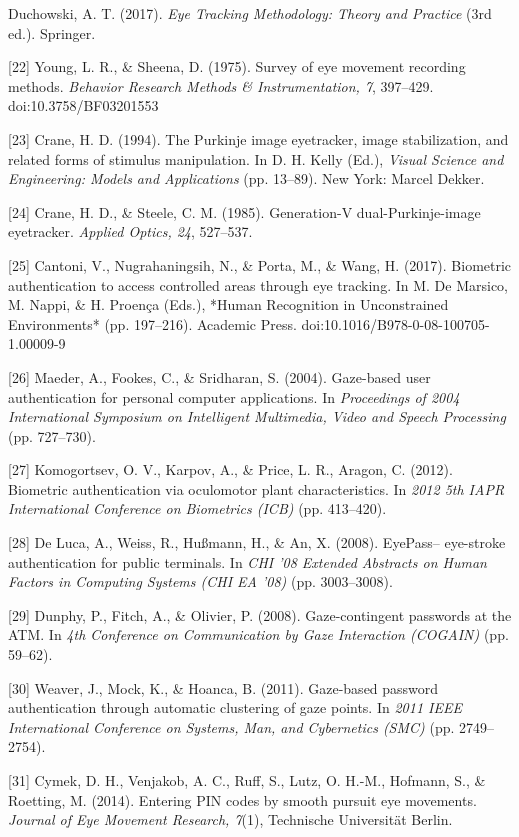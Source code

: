 \documentclass[12pt]{report}
\begin{document}
\begin{raggedright}
[21] Duchowski, A. T. (2017). \textit{Eye Tracking Methodology: Theory and Practice} (3rd ed.). Springer.

[22] Young, L. R., \& Sheena, D. (1975). Survey of eye movement recording methods. \textit{Behavior Research Methods \& Instrumentation, 7}, 397–429. doi:10.3758/BF03201553

[23] Crane, H. D. (1994). The Purkinje image eyetracker, image stabilization, and related forms of stimulus manipulation. In D. H. Kelly (Ed.), \textit{Visual Science and Engineering: Models and Applications} (pp. 13–89). New York: Marcel Dekker.

[24] Crane, H. D., \& Steele, C. M. (1985). Generation-V dual-Purkinje-image eyetracker. \textit{Applied Optics, 24}, 527–537.

[25] Cantoni, V., Nugrahaningsih, N., \& Porta, M., \& Wang, H. (2017). Biometric authentication to access controlled areas through eye tracking. In M. De Marsico, M. Nappi, \& H. Proença (Eds.), *Human Recognition in Unconstrained Environments* (pp. 197–216). Academic Press. doi:10.1016/B978-0-08-100705-1.00009-9

[26] Maeder, A., Fookes, C., \& Sridharan, S. (2004). Gaze-based user authentication for personal computer applications. In \textit{Proceedings of 2004 International Symposium on Intelligent Multimedia, Video and Speech Processing} (pp. 727–730).

[27] Komogortsev, O. V., Karpov, A., \& Price, L. R., Aragon, C. (2012). Biometric authentication via oculomotor plant characteristics. In \textit{2012 5th IAPR International Conference on Biometrics (ICB)} (pp. 413–420).

[28] De Luca, A., Weiss, R., Hußmann, H., \& An, X. (2008). EyePass– eye-stroke authentication for public terminals. In \textit{CHI '08 Extended Abstracts on Human Factors in Computing Systems (CHI EA '08)} (pp. 3003–3008).

[29] Dunphy, P., Fitch, A., \& Olivier, P. (2008). Gaze-contingent passwords at the ATM. In \textit{4th Conference on Communication by Gaze Interaction (COGAIN)} (pp. 59–62).

[30] Weaver, J., Mock, K., \& Hoanca, B. (2011). Gaze-based password authentication through automatic clustering of gaze points. In \textit{2011 IEEE International Conference on Systems, Man, and Cybernetics (SMC)} (pp. 2749–2754).

[31] Cymek, D. H., Venjakob, A. C., Ruff, S., Lutz, O. H.-M., Hofmann, S., \& Roetting, M. (2014). Entering PIN codes by smooth pursuit eye movements. \textit{Journal of Eye Movement Research, 7}(1), Technische Universität Berlin.


\end{raggedright}
\end{document}
